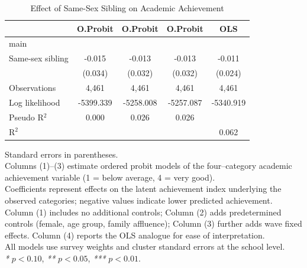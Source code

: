 \documentclass[12pt]{article}
\begin{document}
\begin{table}[htbp]\centering
\caption{Effect of Same-Sex Sibling on Academic Achievement}
\label{tab:main}
\begin{footnotesize}

\begin{tabular}{l*{4}{c}}
\toprule
                &\multicolumn{1}{c}{O.Probit}&\multicolumn{1}{c}{O.Probit}&\multicolumn{1}{c}{O.Probit}&\multicolumn{1}{c}{OLS}\\
\midrule
main            &                  &                  &                  &                  \\
Same-sex sibling&   -0.015         &   -0.013         &   -0.013         &   -0.011         \\
                &  (0.034)         &  (0.032)         &  (0.032)         &  (0.024)         \\
\midrule
Observations    &    4,461         &    4,461         &    4,461         &    4,461         \\
Log likelihood  &-5399.339         &-5258.008         &-5257.087         &-5340.919         \\
Pseudo R$^2$    &    0.000         &    0.026         &    0.026         &                  \\
R$^2$           &                  &                  &                  &    0.062         \\
\bottomrule
\end{tabular}

\vspace{0.35em}
\begin{minipage}{0.9\textwidth}
\footnotesize
\setlength{\parindent}{0pt}
\raggedright
Standard errors in parentheses.\\[0.25em]
Columns (1)--(3) estimate ordered probit models of the four–category academic
achievement variable (1 = below average, 4 = very good).\\
Coefficients represent effects on the latent achievement index underlying the
observed categories; negative values indicate lower predicted achievement.\\
Column (1) includes no additional controls; Column (2) adds predetermined
controls (female, age group, family affluence); Column (3) further adds wave
fixed effects. Column (4) reports the OLS analogue for ease of interpretation.\\
All models use survey weights and cluster standard errors at the school level.\\[0.25em]
\emph{*} $p<0.10$, \emph{**} $p<0.05$, \emph{***} $p<0.01$.
\end{minipage}

\end{footnotesize}
\end{table}
\end{document}

